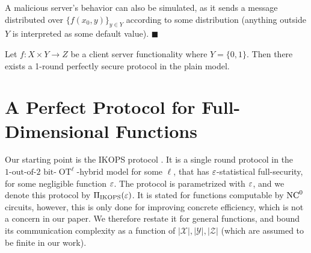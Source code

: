 \documentclass{llncs}
\newcommand{\bnote}[1]{\authnote{Bar}{#1}}
\newcommand{\OT}{\operatorname{OT}}
\newcommand{\bOT}[2]{#1\text{-out-of-}#2\text{ bit-}\OT}
\newcommand{\X}{\mathcal{X}}
\newcommand{\Y}{\mathcal{Y}}
\renewcommand{\Z}{\mathcal{Z}}
\newcommand{\IKOPS}{\operatorname{IKOPS}}
\begin{document}
A malicious server's behavior can also be simulated, as it sends a message distributed over $\{f(x_0,y)\}_{y\in Y}$ according to some distribution (anything outside $Y$ is interpreted as some default value). \hspace*{385pt}$\blacksquare$ 


\begin{corollary}
	Let $f:X\times Y\rightarrow Z$ be a client server functionality where $Y=\{0,1\}$. Then there exists a 1-round perfectly secure protocol in the plain model.
\end{corollary}



\section{A Perfect Protocol for Full-Dimensional Functions}


Our starting point is the IKOPS protocol \cite{IKOPS11}. It is a single round protocol in the $\bOT{1}{2}^\ell$-hybrid model for some $\ell$, that has $\varepsilon$-statistical full-security, for some negligible function $\varepsilon$. The protocol is parametrized with $\varepsilon$, and we denote this protocol by $\Pi_{\IKOPS}(\eps)$. It is stated for functions computable by $\mathrm{NC}^0$ circuits, however, this is only done for improving concrete efficiency, which is not a concern in our paper. We therefore restate it for general functions, and bound its communication complexity as a function of $|\X|,|\Y|,|\Z|$ (which are assumed to be finite in our work).
\end{document}
